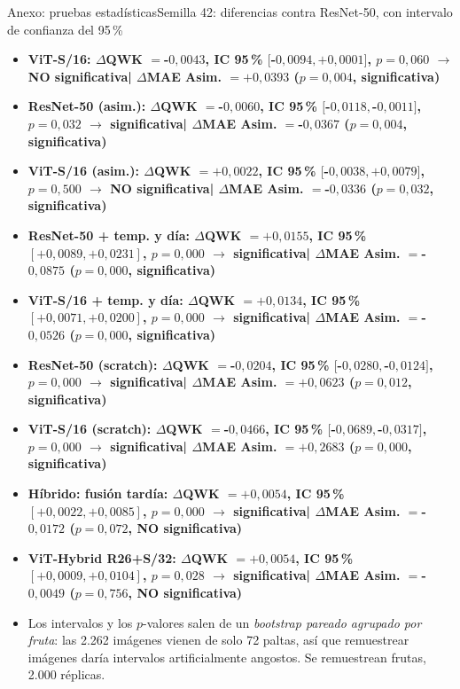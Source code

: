 \documentclass[aspectratio=169,11pt,table]{beamer}
\newcommand{\sig}{\textcolor{verdeosc}{\textbf{significativa}}}
\newcommand{\nosig}{\textcolor{rojo}{\textbf{NO significativa}}}
\begin{document}
\begin{frame}{Anexo: pruebas estadísticas}{Semilla 42: diferencias contra ResNet-50, con intervalo de confianza del 95\,\%}
{\tiny
\setlength{\itemsep}{0.18em}
\begin{itemize}
  \item {\bfseries ViT-S/16: $\Delta$QWK $= $-$0{,}0043$, IC 95\,\% $[$-$0{,}0094, +0{,}0001]$, $p=0{,}060$ $\rightarrow$ \nosig \;|\; $\Delta$MAE Asim. $= +0{,}0393$ ($p=0{,}004$, \sig)}
  \item {\bfseries ResNet-50 (asim.): $\Delta$QWK $= $-$0{,}0060$, IC 95\,\% $[$-$0{,}0118, $-$0{,}0011]$, $p=0{,}032$ $\rightarrow$ \sig \;|\; $\Delta$MAE Asim. $= $-$0{,}0367$ ($p=0{,}004$, \sig)}
  \item {\bfseries ViT-S/16 (asim.): $\Delta$QWK $= +0{,}0022$, IC 95\,\% $[$-$0{,}0038, +0{,}0079]$, $p=0{,}500$ $\rightarrow$ \nosig \;|\; $\Delta$MAE Asim. $= $-$0{,}0336$ ($p=0{,}032$, \sig)}
  \item {\bfseries ResNet-50 + temp. y día: $\Delta$QWK $= +0{,}0155$, IC 95\,\% $[+0{,}0089, +0{,}0231]$, $p=0{,}000$ $\rightarrow$ \sig \;|\; $\Delta$MAE Asim. $= $-$0{,}0875$ ($p=0{,}000$, \sig)}
  \item {\bfseries ViT-S/16 + temp. y día: $\Delta$QWK $= +0{,}0134$, IC 95\,\% $[+0{,}0071, +0{,}0200]$, $p=0{,}000$ $\rightarrow$ \sig \;|\; $\Delta$MAE Asim. $= $-$0{,}0526$ ($p=0{,}000$, \sig)}
  \item {\bfseries ResNet-50 (scratch): $\Delta$QWK $= $-$0{,}0204$, IC 95\,\% $[$-$0{,}0280, $-$0{,}0124]$, $p=0{,}000$ $\rightarrow$ \sig \;|\; $\Delta$MAE Asim. $= +0{,}0623$ ($p=0{,}012$, \sig)}
  \item {\bfseries ViT-S/16 (scratch): $\Delta$QWK $= $-$0{,}0466$, IC 95\,\% $[$-$0{,}0689, $-$0{,}0317]$, $p=0{,}000$ $\rightarrow$ \sig \;|\; $\Delta$MAE Asim. $= +0{,}2683$ ($p=0{,}000$, \sig)}
  \item {\bfseries Híbrido: fusión tardía: $\Delta$QWK $= +0{,}0054$, IC 95\,\% $[+0{,}0022, +0{,}0085]$, $p=0{,}000$ $\rightarrow$ \sig \;|\; $\Delta$MAE Asim. $= $-$0{,}0172$ ($p=0{,}072$, \nosig)}
  \item {\bfseries ViT-Hybrid R26+S/32: $\Delta$QWK $= +0{,}0054$, IC 95\,\% $[+0{,}0009, +0{,}0104]$, $p=0{,}028$ $\rightarrow$ \sig \;|\; $\Delta$MAE Asim. $= $-$0{,}0049$ ($p=0{,}756$, \nosig)}
  \item Los intervalos y los $p$-valores salen de un \emph{bootstrap pareado agrupado por fruta}: las 2.262 imágenes vienen de solo 72 paltas, así que remuestrear imágenes daría intervalos artificialmente angostos. Se remuestrean frutas, 2.000 réplicas.
\end{itemize}
}
\end{frame}
\end{document}
